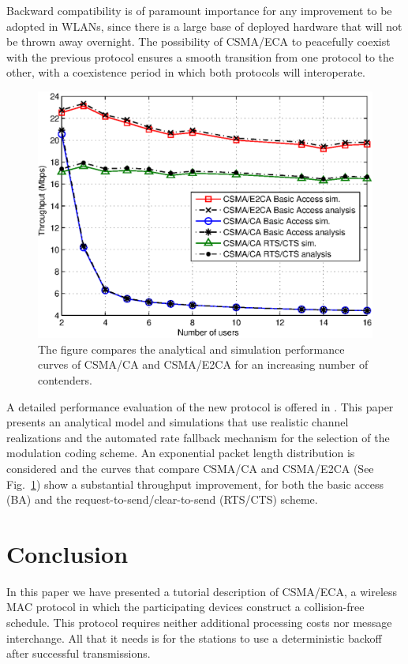 \documentclass[journal]{IEEEtran}
\begin{document}
Backward compatibility is of paramount importance for any improvement to be adopted in WLANs, since there is a large base of deployed hardware that will not be thrown away overnight.
The possibility of CSMA/ECA to peacefully coexist with the previous protocol ensures a smooth transition from one protocol to the other, with a coexistence period in which both protocols will interoperate.

\begin{figure}[!t]
\centering
\includegraphics[width=\linewidth]{figures/performance}
\caption{The figure compares the analytical and simulation performance curves of CSMA/CA and CSMA/E2CA for an increasing number of contenders.}
\label{fig:performance}
\end{figure}

A detailed performance evaluation of the new protocol is offered in \cite{martorell2012pec}.
This paper presents an analytical model and simulations that use realistic channel realizations and the automated rate fallback mechanism for the selection of the modulation coding scheme.
An exponential packet length distribution is considered and the curves that compare CSMA/CA and CSMA/E2CA (See Fig.~\ref{fig:performance}) show a substantial throughput improvement, for both the basic access (BA) and the request-to-send/clear-to-send (RTS/CTS) scheme.


\section{Conclusion} \label{sec:conclusion}
In this paper we have presented a tutorial description of CSMA/ECA, a wireless MAC protocol in which the participating devices construct a collision-free schedule.
This protocol requires neither additional processing costs nor message interchange.
All that it needs is for the stations to use a deterministic backoff after successful transmissions.
\end{document}
